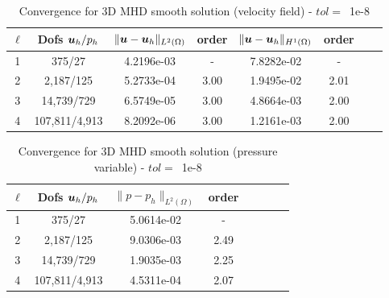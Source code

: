 \begin{table}[h!]
\begin{center}
\begin{tabular}{cccccccc}
\hline
$\ell$ &    Dofs $\boldsymbol u_h/p_h$ & $\|\boldsymbol u-\boldsymbol u_h\|_{L^2(\Omega)}$ & order & $\|\boldsymbol u-\boldsymbol u_h\|_{H^1(\Omega)}$ & order  \\
\hline
  1 &     375/27 &  4.2196e-03 &     - &  7.8282e-02 &     -   \\
  2 &    2,187/125 &  5.2733e-04 &     3.00 &  1.9495e-02 &     2.01 \\

 3 &   14,739/729 &  6.5749e-05 &     3.00 &  4.8664e-03 &     2.00 \\

 4 &  107,811/4,913 &  8.2092e-06 &     3.00 &  1.2161e-03 &     2.00 \\

\hline
\end{tabular}
\caption{Convergence for 3D MHD smooth solution (velocity field) - $tol=$~1e-8}
\label{tab:MHD_3D_smooth_velocity}
\end{center}
\end{table}
\begin{table}[h!]
\begin{center}
\begin{tabular}{cccccccc}
\hline
$\ell$ &    Dofs $\boldsymbol u_h/p_h$ &        $\|{p}-{p}_h\|_{L^2(\Omega)}$ & order \\
\hline
  1 &     375/27 &5.0614e-02 &      - \\
  2 &    2,187/125 &   9.0306e-03 &      2.49 \\

 3 &   14,739/729 &   1.9035e-03 &      2.25 \\

 4 &  107,811/4,913 &   4.5311e-04 &      2.07 \\
\hline
\end{tabular}
\caption{Convergence for 3D MHD smooth solution (pressure variable) - $tol=$~1e-8}
\label{tab:MHD_3D_smooth_pressure}
\end{center}
\end{table}


